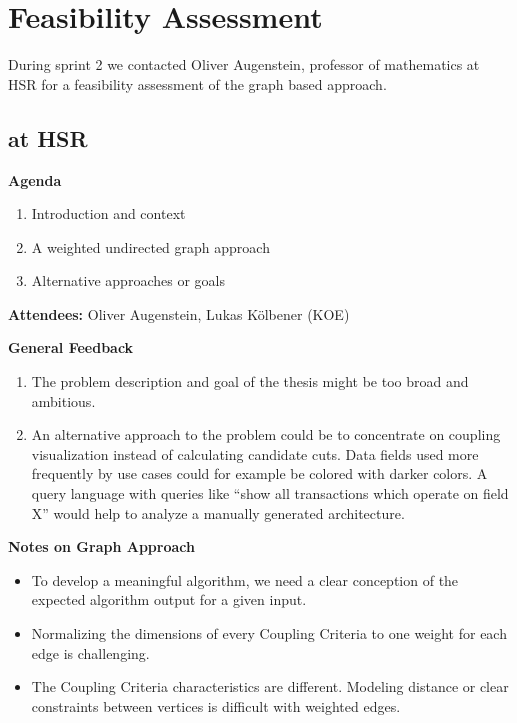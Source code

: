 \section{Feasibility Assessment}

During sprint 2 we contacted Oliver Augenstein, professor of mathematics at \gls{HSR} for a feasibility assessment of the graph based approach. 

\subsection{ at HSR}

\textbf{Agenda}

\begin{enumerate}
\item Introduction and context
\item A weighted undirected graph approach
\item Alternative approaches or goals
\end{enumerate}

\textbf{Attendees:} Oliver Augenstein, Lukas Kölbener (KOE)

\textbf{General Feedback}

\begin{enumerate}
	\item The problem description and goal of the thesis might be too broad and ambitious. 
	\item An alternative approach to the problem could be to concentrate on coupling visualization instead of calculating candidate cuts. Data fields used more frequently by use cases could for example be colored with darker colors. A query language with queries like \enquote{show all transactions which operate on field X} would help to analyze a manually generated architecture. 
\end{enumerate}

\textbf{Notes on Graph Approach}

\begin{itemize}
	\item To develop a meaningful algorithm, we need a clear conception of the expected algorithm output for a given input.
	\item Normalizing the dimensions of every Coupling Criteria to one weight for each edge is challenging.  
	\item The Coupling Criteria characteristics are different. Modeling distance or clear constraints between vertices is difficult with weighted edges.
\end{itemize}


